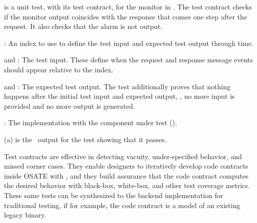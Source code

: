  is a unit test, with its test contract, for the monitor in .
The test contract checks if the monitor output coincides with the response that comes one step after the request.
It also checks that the alarm is not output.
\begin{compactitem}
\item {}: An index to use to define the test input and expected test output through time.
\item {} and : The test input. These define when the request and response message events should appear relative to the index.
\item {} and : The expected test output. 
The test additionally proves that nothing happens after the initial test input and expected output, \ie, no more input is provided and no more output is generated.
\item {}: The implementation with the component under test ().
\end{compactitem}
(a) is the \agr\ output for the test showing that it passes. 

Test contracts are effective in detecting vacuity, under-specified behavior, and missed corner cases.
They enable designers to iteratively develop code contracts inside OSATE with \agr, and they build assurance that the code contract computes the desired behavior with black-box, white-box, and other test coverage metrics.
These same tests can be synthesized to the backend implementation for traditional testing, if for example, the code contract is a model of an existing legacy binary.